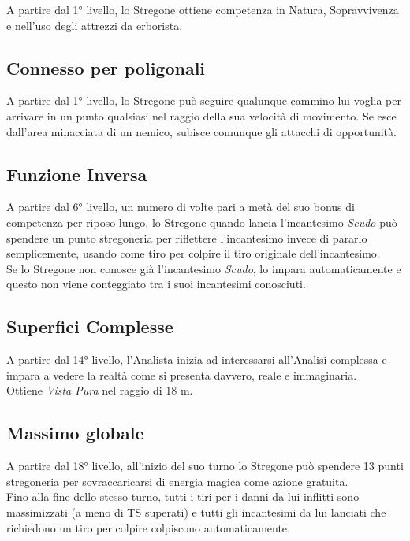 A partire dal 1° livello, lo Stregone ottiene competenza in Natura, Sopravvivenza e nell'uso degli attrezzi da erborista.

\subsection{Connesso per poligonali}

A partire dal 1° livello, lo Stregone può seguire qualunque cammino lui voglia per arrivare in un punto qualsiasi nel raggio della sua velocità di movimento. Se esce dall'area minacciata di un nemico, subisce comunque gli attacchi di opportunità.

\subsection{Funzione Inversa}

A partire dal 6° livello, un numero di volte pari a metà del suo bonus di competenza per riposo lungo, lo Stregone quando lancia l'incantesimo \textit{Scudo} può spendere un punto stregoneria per riflettere l'incantesimo invece di pararlo semplicemente, usando come tiro per colpire il tiro originale dell'incantesimo. \\ Se lo Stregone non conosce già l'incantesimo \textit{Scudo}, lo impara automaticamente e questo non viene conteggiato tra i suoi incantesimi conosciuti.

\subsection{Superfici Complesse}

A partire dal 14° livello, l'Analista inizia ad interessarsi all'Analisi complessa e impara a vedere la realtà come si presenta davvero, reale e immaginaria. \\ Ottiene \textit{Vista Pura} nel raggio di 18 m.

\subsection{Massimo globale}

A partire dal 18° livello, all'inizio del suo turno lo Stregone può spendere 13 punti stregoneria per sovraccaricarsi di energia magica come azione gratuita. \\ Fino alla fine dello stesso turno, tutti i tiri per i danni da lui inflitti sono massimizzati (a meno di TS superati) e tutti gli incantesimi da lui lanciati che richiedono un tiro per colpire colpiscono automaticamente.

